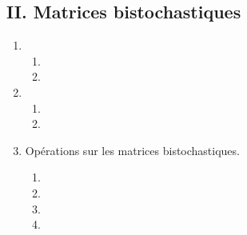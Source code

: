 \subsection*{II. Matrices bistochastiques}
\begin{enumerate}
 \item
 \begin{enumerate}
  \item 
  \item
 \end{enumerate}

 \item 
 \begin{enumerate}
  \item 
  \item
 \end{enumerate}

 \item Opérations sur les matrices bistochastiques.
  \begin{enumerate}
  \item 
  \item
  \item 
  \item
 \end{enumerate}


\end{enumerate}
